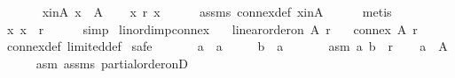 \begin{isabellebody}
\ \ \isamarkupfalse%
\isanewline
\ \ \ \ x{\isacharunderscore}{\kern0pt}in{\isacharunderscore}{\kern0pt}A{\isacharcolon}{\kern0pt}\ {\isachardoublequoteopen}x\ {\isasymin}\ A{\isachardoublequoteclose}\isanewline
\ \ \isamarkupfalse%
\ {\isachardoublequoteopen}x\ {\isasympreceq}\isactrlsub r\ x{\isachardoublequoteclose}\isanewline
\ \ \ \ \isamarkupfalse%
\ assms\ connex{\isacharunderscore}{\kern0pt}def\ x{\isacharunderscore}{\kern0pt}in{\isacharunderscore}{\kern0pt}A\isanewline
\ \ \ \ \isamarkupfalse%
\ metis\isanewline
\ \ \isamarkupfalse%
\ {\isachardoublequoteopen}{\isacharparenleft}{\kern0pt}x{\isacharcomma}{\kern0pt}\ x{\isacharparenright}{\kern0pt}\ {\isasymin}\ r{\isachardoublequoteclose}\isanewline
\ \ \ \ \isamarkupfalse%
\ simp\isanewline
{}\isamarkupfalse%
%
\endisatagproof
{\isafoldproof}%
%
\isadelimproof
\isanewline
%
\endisadelimproof
\isanewline
{}\isamarkupfalse%
\ lin{\isacharunderscore}{\kern0pt}ord{\isacharunderscore}{\kern0pt}imp{\isacharunderscore}{\kern0pt}connex{\isacharcolon}{\kern0pt}\isanewline
\ \ \ {\isachardoublequoteopen}linear{\isacharunderscore}{\kern0pt}order{\isacharunderscore}{\kern0pt}on\ A\ r{\isachardoublequoteclose}\isanewline
\ \ \ {\isachardoublequoteopen}connex\ A\ r{\isachardoublequoteclose}\isanewline
%
\isadelimproof
\ \ %
\endisadelimproof
%
\isatagproof
{}\isamarkupfalse%
\ connex{\isacharunderscore}{\kern0pt}def\ limited{\isacharunderscore}{\kern0pt}def\isanewline
{}\isamarkupfalse%
\ {\isacharparenleft}{\kern0pt}safe{\isacharparenright}{\kern0pt}\isanewline
\ \ \isamarkupfalse%
\isanewline
\ \ \ \ a\ {\isacharcolon}{\kern0pt}{\isacharcolon}{\kern0pt}\ {\isachardoublequoteopen}{\isacharprime}{\kern0pt}a{\isachardoublequoteclose}\ \isanewline
\ \ \ \ b\ {\isacharcolon}{\kern0pt}{\isacharcolon}{\kern0pt}\ {\isachardoublequoteopen}{\isacharprime}{\kern0pt}a{\isachardoublequoteclose}\isanewline
\ \ \isamarkupfalse%
\isanewline
\ \ \ \ asm{}{\isacharcolon}{\kern0pt}\ {\isachardoublequoteopen}{\isacharparenleft}{\kern0pt}a{\isacharcomma}{\kern0pt}\ b{\isacharparenright}{\kern0pt}\ {\isasymin}\ r{\isachardoublequoteclose}\isanewline
\ \ \isamarkupfalse%
\ {\isachardoublequoteopen}a\ {\isasymin}\ A{\isachardoublequoteclose}\isanewline
\ \ \ \ \isamarkupfalse%
\ asm{}\ assms\ partial{\isacharunderscore}{\kern0pt}order{\isacharunderscore}{\kern0pt}onD{\isacharparenleft}{\kern0pt}{}{\isacharparenright}{\kern0pt}\isanewline

\end{isabellebody}
